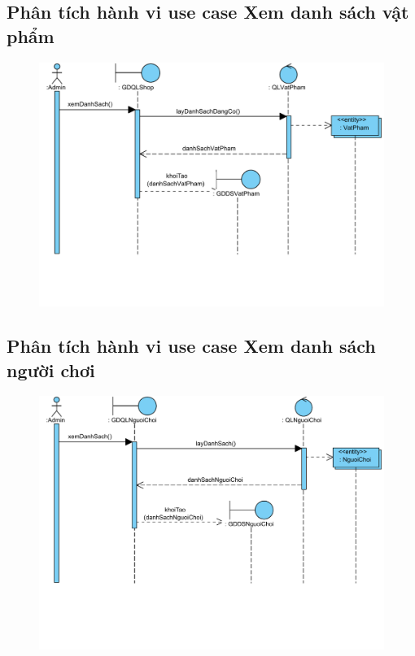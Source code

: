 \documentclass[3p]{elsarticle}
\begin{document}
\subsection{Phân tích hành vi use case Xem danh sách vật phẩm}
\begin{figure}[!htbp]
	\hspace*{-.5in}
	\centering
	\includegraphics[scale=.55]{images/sequence-pdfs/admin/viewListItems.pdf}
\end{figure}
\newpage

\subsection{Phân tích hành vi use case Xem danh sách người chơi}
\begin{figure}[!htbp]
	\hspace*{-.5in}
	\centering
	\includegraphics[scale=.55]{images/sequence-pdfs/admin/viewListPlayer.pdf}
\end{figure}
\newpage
\end{document}
